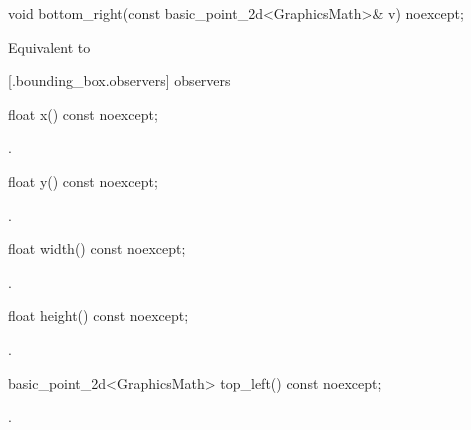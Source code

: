 %
\begin{itemdecl}
void bottom_right(const basic_point_2d<GraphicsMath>& v) noexcept;
\end{itemdecl}
\begin{itemdescr}
\pnum
\effects
Equivalent to 
\end{itemdescr}

 [\iotwod.bounding_box.observers]{ observers}

%
\begin{itemdecl}
float x() const noexcept;
\end{itemdecl}
\begin{itemdescr}
\pnum
\returns
{}.
\end{itemdescr}

%
\begin{itemdecl}
float y() const noexcept;
\end{itemdecl}
\begin{itemdescr}
\pnum
\returns
{}.
\end{itemdescr}

%
\begin{itemdecl}
float width() const noexcept;
\end{itemdecl}
\begin{itemdescr}
\pnum
\returns
{}.
\end{itemdescr}

%
\begin{itemdecl}
float height() const noexcept;
\end{itemdecl}
\begin{itemdescr}
\pnum
\returns
{}.
\end{itemdescr}

%
\begin{itemdecl}
basic_point_2d<GraphicsMath> top_left() const noexcept;
\end{itemdecl}
\begin{itemdescr}
\pnum
\returns
{}.
\end{itemdescr}

